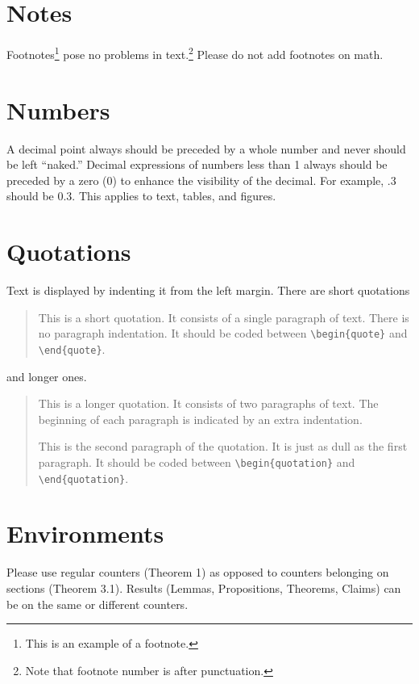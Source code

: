 \documentclass[qe,nameyear,draft]{econsocart}
\theoremstyle{plain}
\theoremstyle{remark}
\begin{document}
\section{Notes}
Footnotes\footnote{This is an example of a footnote.}
pose no problems in text.\footnote{Note that footnote number is after punctuation.} Please do not add footnotes on math. 

\section{Numbers}
A decimal point always should be preceded by a whole number and never should be left ``naked.'' Decimal expressions of numbers less than 1 always should be preceded by a zero (0) to enhance the visibility of the decimal. For example, .3 should be 0.3.   This applies to text, tables, and figures.


\section{Quotations}

Text is displayed by indenting it from the left margin. There are short quotations
\begin{quote}
This is a short quotation.  It consists of a
single paragraph of text.  There is no paragraph
indentation. It should be coded between \verb|\begin{quote}| and \verb|\end{quote}|.
\end{quote}
and longer ones.
\begin{quotation}
This is a longer quotation.  It consists of two paragraphs
of text.  The beginning of each paragraph is indicated
by an extra indentation.

This is the second paragraph of the quotation.  It is just
as dull as the first paragraph. It should be coded between \verb|\begin{quotation}| and \verb|\end{quotation}|.
\end{quotation}

\section{Environments}

Please use regular counters (Theorem 1) as opposed to counters belonging on sections (Theorem 3.1). Results (Lemmas, Propositions, Theorems, Claims) can be on the same or different counters.
\end{document}
